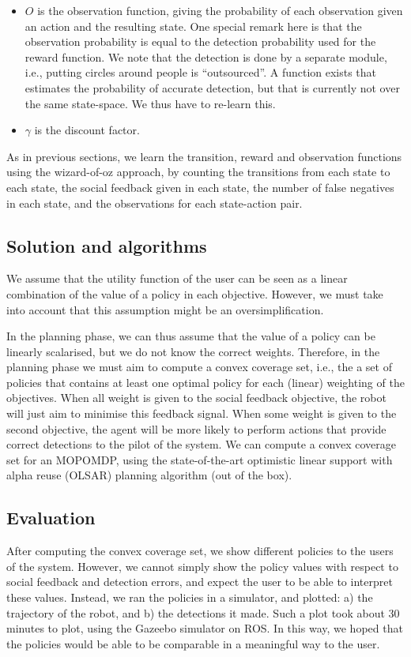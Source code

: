 \documentclass[a4paper,11pt]{report}
\begin{document}
\begin{itemize}
\item $O$ is the observation function, giving the probability of each observation given an action and the resulting state. One special remark here is that the observation probability is equal to the detection probability used for the reward function. We note that the detection is done by a separate module, i.e., putting circles around people is ``outsourced''. A function exists that estimates the probability of accurate detection, but that is currently not over the same state-space. We thus have to re-learn this. 
\item $\gamma$ is the discount factor. 
\end{itemize}

As in previous sections, we learn the transition, reward and observation functions using the wizard-of-oz approach, by counting the transitions from each state to each state, the social feedback given in each state, the number of false negatives in each state, and the observations for each state-action pair. 

\subsection{Solution and algorithms}
We assume that the utility function of the user can be seen as a linear combination of the value of a policy in each objective. However, we must take into account that this assumption might be an oversimplification. 

In the planning phase, we can thus assume that the value of a policy can be linearly scalarised, but we do not know the correct weights. Therefore, in the planning phase we must aim to compute a convex coverage set, i.e., the a set of policies that contains at least one optimal policy for each (linear) weighting of the objectives.  When all weight is given to the social feedback objective, the robot will just aim to minimise this feedback signal. When some weight is given to the second objective, the agent will be more likely to perform actions that provide correct detections to the pilot of the system.  
We can compute a convex coverage set for an MOPOMDP, using the state-of-the-art optimistic linear support with alpha reuse (OLSAR) planning algorithm \cite{roijers2015point} (out of the box).  

\subsection{Evaluation}\label{sec:evalMO}
After computing the convex coverage set, we show different policies to the users of the system. However, we cannot simply show the policy values with respect to social feedback and detection errors, and expect the user to be able to interpret these values. Instead, we ran the policies in a simulator, and plotted: a) the trajectory of the robot, and b) the detections it made. Such a plot took about 30 minutes to plot, using the Gazeebo simulator on ROS. In this way, we hoped that the policies would be able to be comparable in a meaningful way to the user. 
\end{document}
